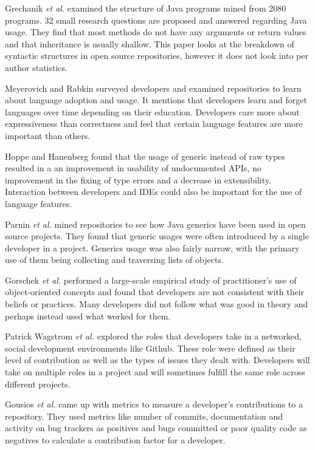 \documentclass{sig-alternate-05-2015}
\begin{document}
Grechanik \textit{et al.} \cite{Grechanik:2010:EIL:1852786.1852801} examined the structure of Java programs mined from 2080 programs. 32 small research questions are proposed and answered regarding Java usage. They find that most methods do not have any arguments or return values and that inheritance is usually shallow. This paper looks at the breakdown of syntactic structures in open source repositories, however it does not look into per author statistics. 

Meyerovich and Rabkin \cite{Meyerovich:2013:EAP:2509136.2509515} surveyed developers and examined repositories to learn about language adoption and usage. It mentions that developers learn and forget languages over time depending on their education. Developers care more about expressiveness than correctness and feel that certain language features are more important than others.

Hoppe and Hanenberg \cite{Hoppe:2013:DBG:2544173.2509528} found that the usage of generic instead of raw types resulted in a an improvement in usability of undocumented APIs, no improvement in the fixing of type errors and a decrease in extensibility. Interaction between developers and IDEs could also be important for the use of language features.

Parnin \textit{et al.} \cite{Parnin:2011:JGA:1985441.1985446} mined repositories to see how Java generics have been used in open source projects. They found that generic usages were often introduced by a single developer in a project. Generics usage was also fairly narrow, with the primary use of them being collecting and traversing lists of objects.

Gorschek \textit{et al.} \cite{Gorschek:2010:LES:1806799.1806820} performed a large-scale empirical study of practitioner's use of object-oriented concepts and found that developers are not consistent with their beliefs or practices. Many developers did not follow what was good in theory and perhaps instead used what worked for them.

Patrick Wagstrom \textit{et al.} \cite{Patrick:Wagstrom:2012} explored the roles that developers take in a networked, social development environments like Github. These role were defined as their level of contribution as well as the types of issues they dealt with. Developers will take on multiple roles in a project and will sometimes fulfill the same role across different projects.

Gousios \textit{et al.} \cite{KGSP09} came up with metrics to measure a developer's contributions to a repository. They used metrics like number of commits, documentation and activity on bug trackers as positives and bugs committed or poor quality code as negatives to calculate a contribution factor for a developer.
\end{document}
